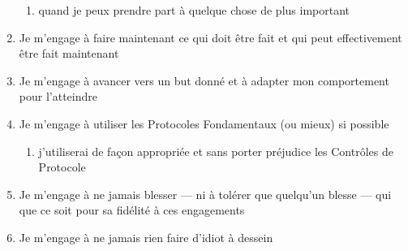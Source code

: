 \documentclass[a4paper,pagesize=pdftex,12pt]{article}
\begin{document}
\begin{enumerate}
\begin{enumerate}
		\item quand je peux prendre part à quelque chose de plus important
	\end{enumerate}
	\item Je m'engage à faire maintenant ce qui doit être fait et qui peut effectivement être fait maintenant
	\item Je m'engage à avancer vers un but donné et à adapter mon comportement pour l'atteindre
	\item Je m'engage à utiliser les Protocoles Fondamentaux (ou mieux) si possible
	\begin{enumerate}
		\item j'utiliserai de façon appropriée et sans porter préjudice les Contrôles de Protocole
	\end{enumerate}
	\item Je m'engage à ne jamais blesser --- ni à tolérer que quelqu'un blesse --- qui que ce soit pour sa fidélité à ces engagements
	\item Je m'engage à ne jamais rien faire d'idiot à dessein
\end{enumerate}
\end{document}

